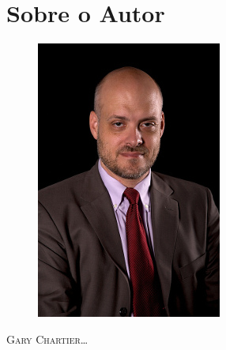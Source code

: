 
\chapter*{Sobre o Autor}

\begin{figure}
\includegraphics[width=1.0\linewidth, fbox]{./assets/gchartier} 
\end{figure}

\textsc{Gary Chartier}\ldots

